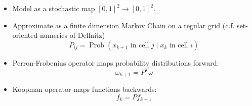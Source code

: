 \documentclass[12pt,t]{beamer}
\begin{document}
\begin{frame}
  \begin{itemize}
  \item Model as a stochastic map $[0,1]^2 \to [0,1]^2$.
  \item Approximate as a finite dimension Markov Chain on a regular
    grid (c.f. set-oriented numerics of Dellnitz)
    \begin{equation*}
      P_{ij} = \operatorname*{Prob}(x_{k+1} \text{ in cell } j \mid
      x_k \text{ in cell } i)
    \end{equation*}
  \item Perron-Frobenius operator maps probability distributions
    forward:
    \begin{equation*}
      \omega_{k+1} = P^T \omega
    \end{equation*}
  \item Koopman operator maps functions backwards:
    \begin{equation*}
      f_k = P f_{k+1}
    \end{equation*}
  \end{itemize}
\end{frame}
\end{document}
